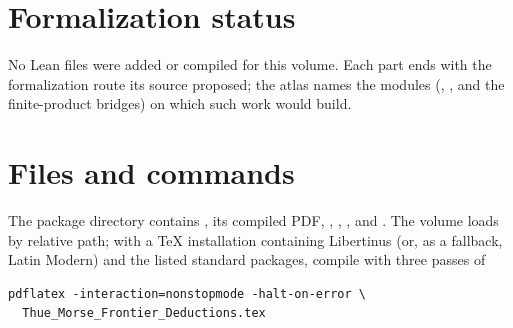 \documentclass[11pt,a4paper,oneside,openany]{book}
\numberwithin{equation}{chapter}
\theoremstyle{definition}
\theoremstyle{remark}
\begin{document}
\section{Formalization status}
No Lean files were added or compiled for this volume. Each part ends with
the formalization route its source proposed; the atlas names the modules
(, ,
and the finite-product bridges) on which such work would build.

\section{Files and commands}
The package directory contains ,
its compiled PDF, , , , and
. The volume loads  by
relative path; with a \TeX{} installation containing Libertinus (or, as a
fallback, Latin Modern) and the listed standard packages, compile with three
passes of
\begin{verbatim}
pdflatex -interaction=nonstopmode -halt-on-error \
  Thue_Morse_Frontier_Deductions.tex
\end{verbatim}

\end{document}
